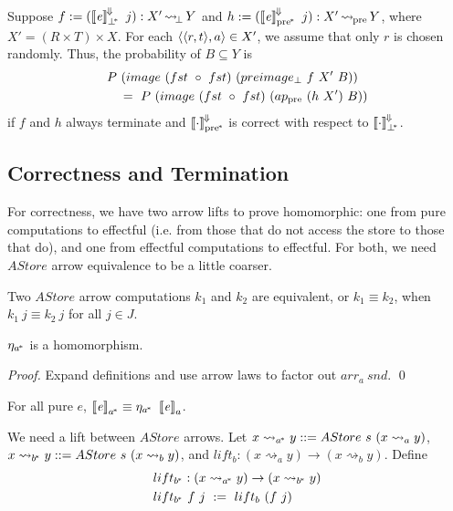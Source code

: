 \documentclass{llncs}
\newcommand{\arrow}{\rightsquigarrow}
\newcommand{\conv}{^{\mspace{-2mu}\Downarrow\mspace{-2mu}}}
\newcommand{\meaningofconv}[1]{\left\llbracket{#1}\right\rrbracket\conv}
\newcommand{\gen}{_a}
\newcommand{\genb}{_b}
\newcommand{\genc}{_{a^{\mspace{-2mu}*}}}
\newcommand{\gend}{_{b^{\mspace{-2mu}*}}}
\newcommand{\pbot}{{\bot^{\mspace{-4mu}*}}}
\newcommand{\pre}{_\mathrm{pre}}
\newcommand{\ppre}{_\mathrm{pre^{\mspace{-2mu}*}}}
\DeclareMathOperator{\botto}{{\arrow\mspace{-3mu}}_\bot}
\DeclareMathOperator{\preto}{{\arrow\mspace{-1mu}}\pre}
\begin{document}
Suppose $f := (\meaningofconv{\mathit{e}}_\pbot~j) : X' \botto Y$ and $h := (\meaningofconv{\mathit{e}}\ppre~j) : X' \preto Y$, where $X' = (R \times T) \times X$.
For each $\langle{\langle{r,t}\rangle,a}\rangle \in X'$, we assume that only $r$ is chosen randomly.
Thus, the probability of $B \subseteq Y$ is
\begin{equation}
\begin{aligned}
	&P~(image~(fst~\circ~fst)~(preimage_\bot~f~X'~B)) \\
	&\tab =\ P~(image~(fst~\circ~fst)~(ap\pre~(h~X')~B))
\end{aligned}
\end{equation}
if $f$ and $h$ always terminate and $\meaningofconv{\cdot}\ppre$ is correct with respect to $\meaningofconv{\cdot}_\pbot$.

\subsection{Correctness and Termination}

For correctness, we have two arrow lifts to prove homomorphic: one from pure computations to effectful (i.e. from those that do not access the store to those that do), and one from effectful computations to effectful.
For both, we need $AStore$ arrow equivalence to be a little coarser.

\begin{definition}
Two $AStore$ arrow computations $k_1$ and $k_2$ are equivalent, or $k_1 \equiv k_2$, when $k_1~j \equiv k_2~j$ for all $j \in J$.
\end{definition}

\begin{theorem}
$\eta\genc$ is a homomorphism.
\end{theorem}
\begin{proof}
Expand definitions and use arrow laws to factor out $arr\gen~snd$.
\qed
\end{proof}

\begin{corollary}
\label{cor:pure-astore-semantic-correctness}
For all pure $\mathit{e}$, $\meaningof{\mathit{e}}\genc \equiv \eta\genc~\meaningof{\mathit{e}}\gen$.
\end{corollary}

We need a lift between $AStore$ arrows.
Let $x \arrow\genc y ::= AStore~s~(x \arrow\gen y)$, $x \arrow\gend y ::= AStore~s~(x \arrow\genb y)$, and $lift\genb : (x \arrow\gen y) \to (x \arrow\genb y)$.
Define
\begin{equation}
\begin{aligned}
	&lift\gend : (x \arrow\genc y) \to (x \arrow\gend y) \\
	&lift\gend~f~j \ := \ lift\genb~(f~j)
\end{aligned}
\end{equation}
\end{document}
